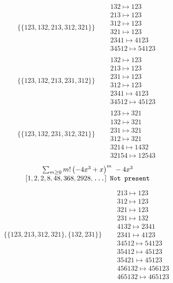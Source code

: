 \begin{tiny}
\begin{align}
\{\{123, 132, 213, 312, 321\}\}
\quad
&
\begin{matrix}
132 \mapsto 123\\213 \mapsto 123\\312 \mapsto 123\\321 \mapsto 123\\2341 \mapsto 4123\\34512 \mapsto 54123
\end{matrix}
\\
\{\{123, 132, 213, 231, 312\}\}
\quad
&
\begin{matrix}
132 \mapsto 123\\213 \mapsto 123\\231 \mapsto 123\\312 \mapsto 123\\2341 \mapsto 4123\\34512 \mapsto 45123
\end{matrix}
\\
\{\{123, 132, 231, 312, 321\}\}
\quad
&
\begin{matrix}
123 \mapsto 321\\132 \mapsto 321\\231 \mapsto 321\\312 \mapsto 321\\3214 \mapsto 1432\\32154 \mapsto 12543
\end{matrix}
\end{align}
$$
\begin{matrix}
\sum_{m \geq 0} m! \left(
-4 x^{3} + x
\right)^m
\ 
-4 x^{3}
\\
\left[1, 2, 2, 8, 48, 368, 2928, \text{\texttt{...}}\right]
\ 
\texttt{Not present}
\end{matrix}
$$
\vspace{-1em}
\begin{align}
\{\{123, 213, 312, 321\}, \{132, 231\}\}
\quad
&
\begin{matrix}
213 \mapsto 123\\312 \mapsto 123\\321 \mapsto 123\\231 \mapsto 132\\4132 \mapsto 2341\\2341 \mapsto 4123\\34512 \mapsto 54123\\35412 \mapsto 45123\\35421 \mapsto 45123\\456132 \mapsto 456123\\465132 \mapsto 465123

\end{matrix}
\end{align}
\end{tiny}
